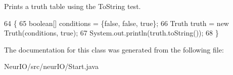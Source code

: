 Prints a truth table using the To\+String test. 
\begin{DoxyCode}
64                                         \{
65         \textcolor{keywordtype}{boolean}[] conditions = \{\textcolor{keyword}{false}, \textcolor{keyword}{false}, \textcolor{keyword}{true}\};
66         Truth truth = \textcolor{keyword}{new} Truth(conditions, \textcolor{keyword}{true});
67         System.out.println(truth.toString());
68     \}
\end{DoxyCode}


The documentation for this class was generated from the following file\+:\begin{DoxyCompactItemize}
\item 
Neur\+I\+O/src/neur\+I\+O/Start.\+java\end{DoxyCompactItemize}

